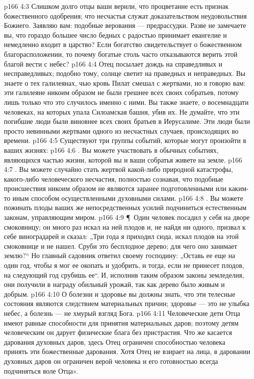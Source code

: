 \vs p166 4:3 Слишком долго отцы ваши верили, что процветание есть признак божественного одобрения; что несчастья служат доказательством неудовольствия Божиего. Заявляю вам: подобные верования --- предрассудки. Разве не замечаете вы, что гораздо большее число бедных с радостью принимает евангелие и немедленно входит в царство? Если богатство свидетельствует о божественном благорасположении, то почему богатые столь часто отказываются верить этой благой вести с небес?
\vs p166 4:4 Отец посылает дождь на справедливых и несправедливых; подобно тому, солнце светит на праведных и неправедных. Вы знаете о тех галилеянах, чью кровь Пилат смешал с жертвами, но я говорю вам: эти галилеяне никоим образом не были грешнее всех своих собратьев, потому лишь только что это случилось именно с ними. Вы также знаете, о восемнадцати человеках, на которых упала Силоамская башня, убив их. Не думайте, что эти погибшие люди были виновнее всех своих братьев в Иерусалиме. Эти люди были просто невинными жертвами одного из несчастных случаев, происходящих во времени.
\vs p166 4:5 Существуют три группы событий, которые могут произойти в ваших жизнях:
\vs p166 4:6 . Вы можете участвовать в обычных событиях, являющихся частью жизни, которой вы и ваши собратья живете на земле.
\vs p166 4:7 . Вы можете случайно стать жертвой какой\hyp{}либо природной катастрофы, какого\hyp{}либо человеческого несчастия, полностью сознавая, что подобные происшествия никоим образом не являются заранее подготовленными или каким\hyp{}то иным способом осуществленными духовными силами.
\vs p166 4:8 . Вы можете пожинать плоды ваших же непосредственных усилий подчиниться естественным законам, управляющим миром.
\vs p166 4:9 \P\ Один человек посадил у себя на дворе смоковницу; он много раз искал на ней плодов и, не найдя ни одного, призвал к себе виноградарей и сказал: „Три года я приходил сюда, искал плодов на этой смоковнице и не нашел. Сруби это бесплодное дерево; для чего оно занимает землю?“ Но главный садовник ответил своему господину: „Оставь ее еще на один год, чтобы я мог ее окопать и удобрить, и тогда, если не принесет плодов, на следующий год срубишь ее“. И, исполнив таким образом законы земледелия, они получили в награду обильный урожай, так как дерево было живым и добрым.
\vs p166 4:10 О болезни и здоровье вы должны знать, что эти телесные состояния являются следствием материальных причин; здоровье --- это не улыбка небес, а болезнь --- не хмурый взгляд Бога.
\vs p166 4:11 Человеческие дети Отца имеют равные способности для принятия материальных даров; поэтому детям человеческим он дарует физические блага без пристрастия. Что же касается дарования духовных даров, здесь Отец ограничен способностью человека принять эти божественные дарования. Хотя Отец не взирает на лица, в даровании духовных даров он ограничен верой человека и его готовностью всегда подчиняться воле Отца».
